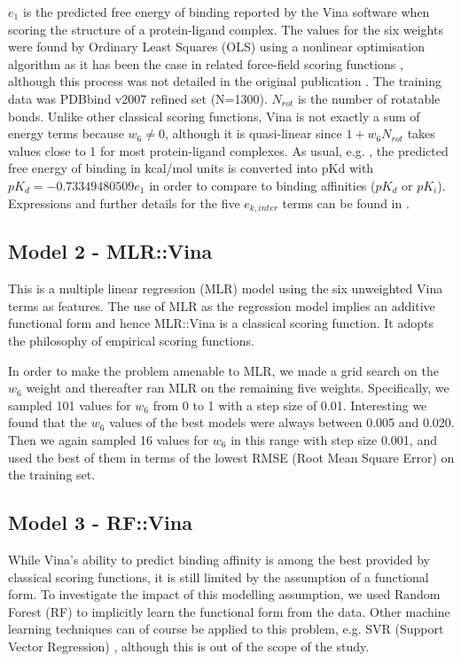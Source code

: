 $e_1$ is the predicted free energy of binding reported by the Vina software when scoring the structure of a protein-ligand complex. The values for the six weights were found by Ordinary Least Squares (OLS) using a nonlinear optimisation algorithm as it has been the case in related force-field scoring functions \citep{1454}, although this process was not detailed in the original publication \citep{595}. The training data was PDBbind v2007 refined set (N=1300). $N_{rot}$ is the number of rotatable bonds. Unlike other classical scoring functions, Vina is not exactly a sum of energy terms because $w_6\neq0$, although it is quasi-linear since $1+w_6N_{rot}$ takes values close to 1 for most protein-ligand complexes. As usual, e.g. \citep{1362}, the predicted free energy of binding in kcal/mol units is converted into pKd with $pK_d=-0.73349480509e_1$ in order to compare to binding affinities ($pK_d$ or $pK_i$). Expressions and further details for the five $e_{k, inter}$ terms can be found in \citep{595,1362}.

\subsection{Model 2 - MLR::Vina}

This is a multiple linear regression (MLR) model using the six unweighted Vina terms as features. The use of MLR as the regression model implies an additive functional form and hence MLR::Vina is a classical scoring function. It adopts the philosophy of empirical scoring functions.

In order to make the problem amenable to MLR, we made a grid search on the $w_6$ weight and thereafter ran MLR on the remaining five weights. Specifically, we sampled 101 values for $w_6$ from 0 to 1 with a step size of 0.01. Interesting we found that the $w_6$ values of the best models were always between 0.005 and 0.020. Then we again sampled 16 values for $w_6$ in this range with step size 0.001, and used the best of them in terms of the lowest RMSE (Root Mean Square Error) on the training set.

\subsection{Model 3 - RF::Vina}

While Vina's ability to predict binding affinity is among the best provided by classical scoring functions, it is still limited by the assumption of a functional form. To investigate the impact of this modelling assumption, we used Random Forest (RF) \citep{1309} to implicitly learn the functional form from the data. Other machine learning techniques can of course be applied to this problem, e.g. SVR (Support Vector Regression) \citep{1295}, although this is out of the scope of the study.

